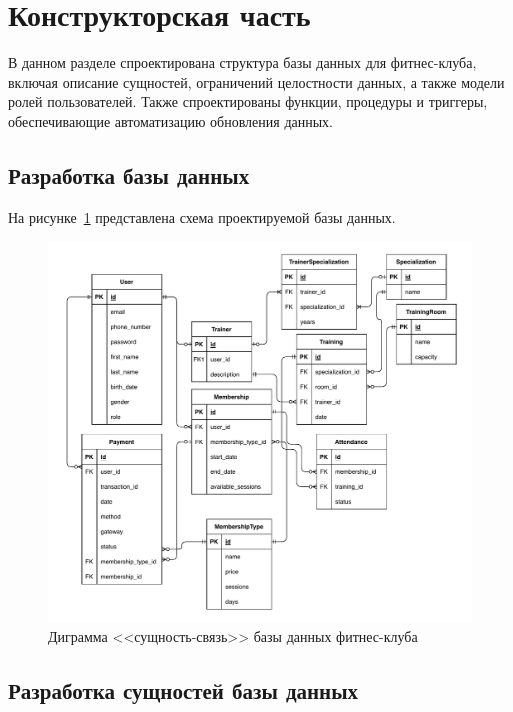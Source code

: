 \section{Конструкторская часть}

В данном разделе спроектирована структура базы данных для фитнес-клуба, включая описание сущностей, ограничений целостности данных, а также модели ролей пользователей. Также спроектированы функции, процедуры и триггеры, обеспечивающие автоматизацию обновления данных.

\subsection{Разработка базы данных}

На рисунке~\ref{fig:db-er} представлена схема проектируемой базы данных.

\begin{figure}[ht!]
	\begin{center}
		\includegraphics[scale=0.8]{./diag/db-er.pdf}
	\end{center}
	\caption{Диграмма <<сущность-связь>> базы данных фитнес-клуба}
	\label{fig:db-er}
\end{figure}

\subsection{Разработка сущностей базы данных}

